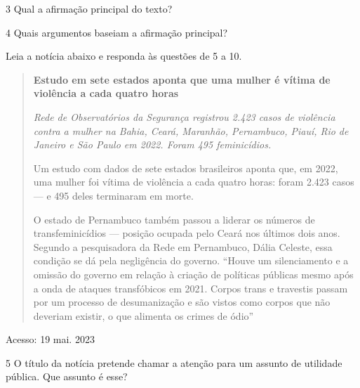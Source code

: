 {\num{3} Qual a afirmação principal do texto?


\num{4} Quais argumentos baseiam a afirmação principal?


Leia a notícia abaixo e responda às questões de 5 a 10.

\begin{quote}

\textbf{Estudo em sete estados aponta que uma mulher é vítima de
violência a cada quatro horas}

\emph{Rede de Observatórios da Segurança registrou 2.423 casos de
violência contra a mulher na Bahia, Ceará, Maranhão, Pernambuco, Piauí,
Rio de Janeiro e São Paulo em 2022. Foram 495 feminicídios.}

Um estudo com dados de sete estados brasileiros aponta que, em 2022, uma
mulher foi vítima de violência a cada quatro horas: foram 2.423 casos
--- e 495 deles terminaram em morte.

O estado de Pernambuco também passou a liderar os números de
transfeminicídios --- posição ocupada pelo Ceará nos últimos dois
anos. Segundo a pesquisadora da Rede em Pernambuco, Dália Celeste, essa
condição se dá pela negligência do governo. ``Houve um silenciamento e a
omissão do governo em relação à criação de políticas públicas mesmo após
a onda de ataques transfóbicos em 2021. Corpos trans e travestis passam
por um processo de desumanização e são vistos como corpos que não
deveriam existir, o que alimenta os crimes de ódio'' 

\end{quote}

Acesso: 19 mai. 2023}

\num{5} O título da notícia pretende chamar a atenção para um assunto de utilidade pública. Que assunto é esse?


